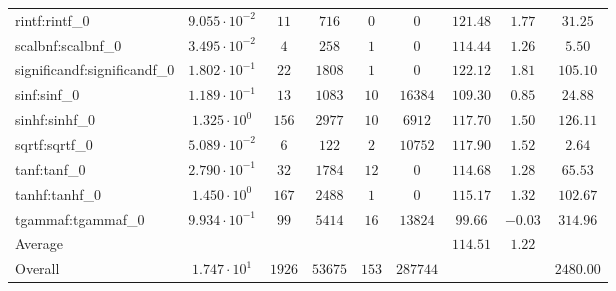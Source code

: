 \begin{tabular}{|l|c|c|c|c|c|c|c|c|}
rintf:rintf\_0               & $ 9.055 \cdot 10^{-2} $ & $ 11     $ & $ 716   $ & $ 0   $ & $ 0      $ & $ 121.48      $ & $ 1.77    $ & $ 31.25   $ \\
scalbnf:scalbnf\_0           & $ 3.495 \cdot 10^{-2} $ & $ 4      $ & $ 258   $ & $ 1   $ & $ 0      $ & $ 114.44      $ & $ 1.26    $ & $ 5.50    $ \\
significandf:significandf\_0 & $ 1.802 \cdot 10^{-1} $ & $ 22     $ & $ 1808  $ & $ 1   $ & $ 0      $ & $ 122.12      $ & $ 1.81    $ & $ 105.10  $ \\
sinf:sinf\_0                 & $ 1.189 \cdot 10^{-1} $ & $ 13     $ & $ 1083  $ & $ 10  $ & $ 16384  $ & $ 109.30      $ & $ 0.85    $ & $ 24.88   $ \\
sinhf:sinhf\_0               & $ 1.325 \cdot 10^{0}  $ & $ 156    $ & $ 2977  $ & $ 10  $ & $ 6912   $ & $ 117.70      $ & $ 1.50    $ & $ 126.11  $ \\
sqrtf:sqrtf\_0               & $ 5.089 \cdot 10^{-2} $ & $ 6      $ & $ 122   $ & $ 2   $ & $ 10752  $ & $ 117.90      $ & $ 1.52    $ & $ 2.64    $ \\
tanf:tanf\_0                 & $ 2.790 \cdot 10^{-1} $ & $ 32     $ & $ 1784  $ & $ 12  $ & $ 0      $ & $ 114.68      $ & $ 1.28    $ & $ 65.53   $ \\
tanhf:tanhf\_0               & $ 1.450 \cdot 10^{0}  $ & $ 167    $ & $ 2488  $ & $ 1   $ & $ 0      $ & $ 115.17      $ & $ 1.32    $ & $ 102.67  $ \\
tgammaf:tgammaf\_0           & $ 9.934 \cdot 10^{-1} $ & $ 99     $ & $ 5414  $ & $ 16  $ & $ 13824  $ & $ 99.66       $ & $ -0.03   $ & $ 314.96  $ \\
\hline
Average                      & $                     $ & $        $ & $       $ & $     $ & $        $ & $ 114.51      $ & $ 1.22    $ & $         $ \\
\hline
Overall                      & $ 1.747 \cdot 10^{1}  $ & $ 1926   $ & $ 53675 $ & $ 153 $ & $ 287744 $ & $             $ & $         $ & $ 2480.00 $ \\
\hline
\end{tabular}
